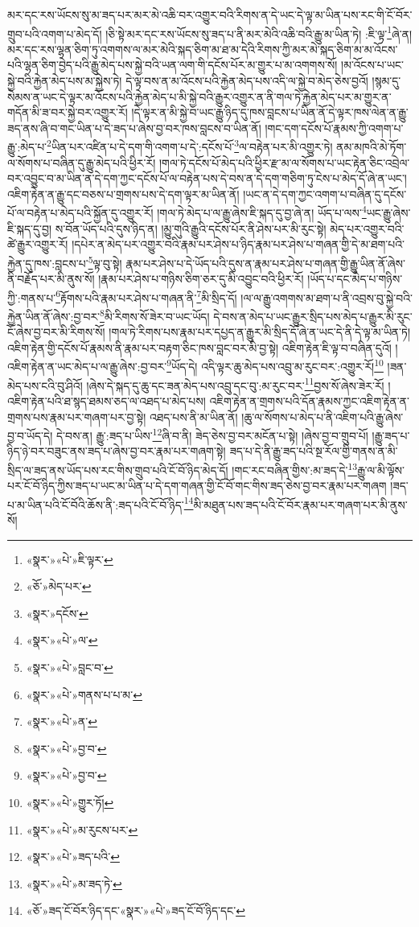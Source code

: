 མར་དང་རས་ཡོངས་སུ་མ་ཟད་པར་མར་མེ་འཆི་བར་འགྱུར་བའི་རིགས་ན་དེ་ཡང་དེ་ལྟ་མ་ཡིན་པས་རང་གི་ངོ་བོར་གྲུབ་པའི་འགག་པ་མེད་དོ། །ཅི་སྟེ་མར་དང་རས་ཡོངས་སུ་ཟད་པ་ནི་མར་མེའི་འཆི་བའི་རྒྱུ་མ་ཡིན་ཏེ། :ཇི་ལྟ་\footnote{«སྣར་»«པེ་»ཇི་ལྟར་}ཞེ་ན། མར་དང་རས་ལྷན་ཅིག་ཏུ་འགགས་ལ་མར་མེའི་སྐད་ཅིག་མ་ཐ་མ་དེའི་རིགས་ཀྱི་མར་མེ་སྐད་ཅིག་མ་མ་འོངས་པའི་ལྷན་ཅིག་བྱེད་པའི་རྒྱུ་མེད་པས་སྐྱེ་བའི་ཡན་ལག་གི་དངོས་པོར་མ་གྱུར་པ་མ་འགགས་སོ། །མ་འོངས་པ་ཡང་སྐྱེ་བའི་རྐྱེན་མེད་པས་མ་སྐྱེས་ཏེ། དེ་ལྟ་བས་ན་མ་འོངས་པའི་རྐྱེན་མེད་པས་འདི་ལ་སྐྱེ་བ་མེད་ཅེས་བྱའོ། །སྙམ་དུ་སེམས་ན་ཡང་དེ་ལྟར་མ་འོངས་པའི་རྐྱེན་མེད་པ་མི་སྐྱེ་བའི་རྒྱུར་འགྱུར་ན་ནི་གལ་ཏེ་རྐྱེན་མེད་པར་མ་གྱུར་ན་གདོན་མི་ཟ་བར་སྐྱེ་བར་འགྱུར་རོ། །དེ་ལྟར་ན་མི་སྐྱེ་བ་ཡང་རྒྱུ་ཉིད་དུ་ཁས་བླངས་པ་ཡིན་ནོ་དེ་ལྟར་ཁས་ལེན་ན་རྒྱུ་ཟད་ནས་ཞི་བ་གང་ཡིན་པ་དེ་ཟད་པ་ཞེས་བྱ་བར་ཁས་བླངས་བ་ཡིན་ནོ། །གང་དག་དངོས་པོ་རྣམས་ཀྱི་འགག་པ་རྒྱུ་:མེད་པ་\footnote{«ཅོ་»མེད་པར་}ཡིན་པར་འཛིན་པ་དེ་དག་གི་འགག་པ་དེ་:དངོས་པོ་\footnote{«སྣར་»དངོས་}ལ་བརྟེན་པར་མི་འགྱུར་ཏེ། ནམ་མཁའི་མེ་ཏོག་ལ་སོགས་པ་བཞིན་དུ་རྒྱུ་མེད་པའི་ཕྱིར་རོ། །གལ་ཏེ་དངོས་པོ་མེད་པའི་ཕྱིར་རྫ་མ་ལ་སོགས་པ་ཡང་རྟེན་ཅིང་འབྲེལ་བར་འབྱུང་བ་མ་ཡིན་ན་དེ་དག་ཀྱང་དངོས་པོ་ལ་བརྟེན་པས་དེ་བས་ན་དེ་དག་གཅིག་ཏུ་ངེས་པ་མེད་དོ་ཞེ་ན་ཡང་། འཇིག་རྟེན་ན་རྒྱུ་དང་བཅས་པ་གྲགས་པས་དེ་དག་ལྟར་མ་ཡིན་ནོ། །ཡང་ན་དེ་དག་ཀྱང་འགག་པ་བཞིན་དུ་དངོས་པོ་ལ་བརྟེན་པ་མེད་པའི་སྐྱོན་དུ་འགྱུར་རོ། །གལ་ཏེ་མེད་པ་ལ་རྒྱུ་ཞེས་ཇི་སྐད་དུ་བྱ་ཞེ་ན། ཡོད་པ་ལས་\footnote{«སྣར་»«པེ་»ལ་}ཡང་རྒྱུ་ཞེས་ཇི་སྐད་དུ་བྱ། ས་བོན་ཡོད་པའི་དུས་ཉིད་ན། །མྱུ་གུའི་རྒྱུའི་དངོས་པོར་ནི་ཤེས་པར་མི་རུང་སྟེ། མེད་པར་འགྱུར་བའི་ཚེ་རྒྱུར་འགྱུར་རོ། །དཔེར་ན་མེད་པར་འགྱུར་བའི་རྣམ་པར་ཤེས་པ་ཉིད་རྣམ་པར་ཤེས་པ་གཞན་གྱི་དེ་མ་ཐག་པའི་རྐྱེན་དུ་ཁས་:བླངས་པ་\footnote{«སྣར་»«པེ་»བླང་བ་}ལྟ་བུ་སྟེ། རྣམ་པར་ཤེས་པ་དེ་ཡོད་པའི་དུས་ན་རྣམ་པར་ཤེས་པ་གཞན་གྱི་རྒྱུ་ཡིན་ནོ་ཞེས་ནི་བརྗོད་པར་མི་ནུས་སོ། །རྣམ་པར་ཤེས་པ་གཉིས་ཅིག་ཅར་དུ་མི་འབྱུང་བའི་ཕྱིར་རོ། །ཡོད་པ་དང་མེད་པ་གཉིས་ཀྱི་:གནས་པ་\footnote{«སྣར་»«པེ་»གནས་པ་པ་མ་}རྟོགས་པའི་རྣམ་པར་ཤེས་པ་གཞན་ནི་\footnote{«སྣར་»«པེ་»ན་}མི་སྲིད་དོ། །ལ་ལ་རྒྱུ་འགགས་མ་ཐག་པ་ནི་འབྲས་བུ་སྐྱེ་བའི་རྐྱེན་ཡིན་ནོ་ཞེས་:བྱ་བར་\footnote{«སྣར་»«པེ་»བྱ་བ་}མི་རིགས་སོ་ཟེར་བ་ཡང་ཡོད། དེ་བས་ན་མེད་པ་ཡང་རྒྱུར་སྲིད་པས་མེད་པ་རྒྱུར་མི་རུང་ངོ་ཞེས་བྱ་བར་མི་རིགས་སོ། །གལ་ཏེ་རིགས་པས་རྣམ་པར་དཔྱད་ན་རྒྱུར་མི་སྲིད་དོ་ཞེ་ན་ཡང་དེ་ནི་དེ་ལྟ་མ་ཡིན་ཏེ། འཇིག་རྟེན་གྱི་དངོས་པོ་རྣམས་ནི་རྣམ་པར་བརྟག་ཅིང་ཁས་བླང་བར་མི་བྱ་སྟེ། འཇིག་རྟེན་ཇི་ལྟ་བ་བཞིན་དུའོ། །འཇིག་རྟེན་ན་ཡང་མེད་པ་ལ་རྒྱུ་ཞེས་:བྱ་བར་\footnote{«སྣར་»«པེ་»བྱ་བ་}ཡོད་དེ། འདི་ལྟར་ཆུ་མེད་པས་འབྲུ་མ་རུང་བར་:འགྱུར་རོ།\footnote{«སྣར་»«པེ་»གྱུར་ཏོ།} །ཟན་མེད་པས་ངའི་བུ་ཤིའོ། །ཞེས་དེ་སྐད་དུ་ཆུ་དང་ཟན་མེད་པས་འབྲུ་དང་བུ་:མ་རུང་བར་\footnote{«སྣར་»«པེ་»མ་རུངས་པར་}བྱས་སོ་ཞེས་ཟེར་རོ། །འཇིག་རྟེན་པའི་ཐ་སྙད་ཐམས་ཅད་ལ་འཐད་པ་མེད་པས། འཇིག་རྟེན་ན་གྲགས་པའི་དོན་རྣམས་ཀྱང་འཇིག་རྟེན་ན་གྲགས་པས་རྣམ་པར་གཞག་པར་བྱ་སྟེ། འཐད་པས་ནི་མ་ཡིན་ནོ། །ཆུ་ལ་སོགས་པ་མེད་པ་ནི་འཇིག་པའི་རྒྱུ་ཞེས་བྱ་བ་ཡོད་དེ། དེ་བས་ན། རྒྱུ་:ཟད་པ་ཡིས་\footnote{«སྣར་»«པེ་»ཟད་པའི་}ཞི་བ་ནི། ཟེད་ཅེས་བྱ་བར་མངོན་པ་སྟེ། །ཞེས་བྱ་བ་གྲུབ་པོ། །རྒྱུ་ཟད་པ་ཉིད་ཉེ་བར་བཟུང་ནས་ཟད་པ་ཞེས་བྱ་བར་རྣམ་པར་གཞག་སྟེ། ཟད་པ་དེ་ནི་རྒྱུ་ཟད་པའི་སྔ་རོལ་གྱི་གནས་ན་མི་སྲིད་ལ་ཟད་ནས་ཡོད་པས་རང་གིས་གྲུབ་པའི་ངོ་བོ་ཉིད་མེད་དོ། །གང་རང་བཞིན་གྱིས་:མ་ཟད་དེ་\footnote{«སྣར་»«པེ་»མ་ཟད་ཏེ་}རྒྱུ་ལ་མི་ལྟོས་པར་ངོ་བོ་ཉིད་ཀྱིས་ཟད་པ་ཡང་མ་ཡིན་པ་དེ་དག་གཞན་གྱི་ངོ་བོ་གང་གིས་ཟད་ཅེས་བྱ་བར་རྣམ་པར་གཞག །ཟད་པ་མ་ཡིན་པའི་ངོ་བོའི་ཆོས་ནི་:ཟད་པའི་ངོ་བོ་ཉིད་\footnote{«ཅོ་»ཟད་ངོ་བོར་ཉིད་དང་«སྣར་»«པེ་»ཟད་ངོ་བོ་ཉིད་དང་}མི་མཐུན་པས་ཟད་པའི་ངོ་བོར་རྣམ་པར་གཞག་པར་མི་ནུས་སོ། 